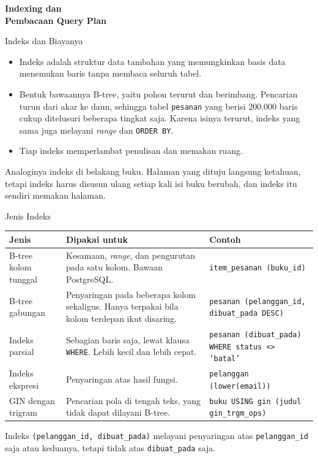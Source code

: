 \documentclass[aspectratio=169, table, 12pt]{beamer}
\begin{document}
\begin{frame}{\hfill}
  \centering
  \Huge{\textbf{Indexing dan\\Pembacaan Query Plan}}
\end{frame}

\begin{frame}{{\Large Indeks dan Biayanya}}
  \vspace{10pt}
  \begin{itemize}
    \item Indeks adalah struktur data tambahan yang memungkinkan basis data
          menemukan baris tanpa membaca seluruh tabel.
    \item Bentuk bawaannya B-tree, yaitu pohon terurut dan berimbang.
          Pencarian turun dari akar ke daun, sehingga tabel \texttt{pesanan}
          yang berisi 200.000 baris cukup ditelusuri beberapa tingkat saja.
          Karena isinya terurut, indeks yang sama juga melayani \textit{range}
          dan \texttt{ORDER BY}.
    \item Tiap indeks memperlambat penulisan dan memakan ruang.
  \end{itemize}
  \vspace{10pt}
  {\footnotesize Analoginya indeks di belakang buku. Halaman yang dituju
  langsung ketahuan, tetapi indeks harus disusun ulang setiap kali isi buku
  berubah, dan indeks itu sendiri memakan halaman.}
\end{frame}

\begin{frame}{{\Large Jenis Indeks}}
  \vspace{5pt}
  {\centering
  {\scriptsize
  \begin{tabularx}{\textwidth}{lYY}
    \hline
    \textbf{Jenis} & \textbf{Dipakai untuk} & \textbf{Contoh} \\
    \hline
    B-tree kolom tunggal & Kesamaan, \textit{range}, dan pengurutan pada satu kolom. Bawaan PostgreSQL. & \texttt{item\_pesanan (buku\_id)} \\
    \hline
    B-tree gabungan & Penyaringan pada beberapa kolom sekaligus. Hanya terpakai bila kolom terdepan ikut disaring. & \texttt{pesanan (pelanggan\_id, dibuat\_pada DESC)} \\
    \hline
    Indeks parsial & Sebagian baris saja, lewat klausa \texttt{WHERE}. Lebih kecil dan lebih cepat. & \texttt{pesanan (dibuat\_pada) WHERE status <> 'batal'} \\
    \hline
    Indeks ekspresi & Penyaringan atas hasil fungsi. & \texttt{pelanggan (lower(email))} \\
    \hline
    GIN dengan trigram & Pencarian pola di tengah teks, yang tidak dapat dilayani B-tree. & \texttt{buku USING gin (judul gin\_trgm\_ops)} \\
    \hline
  \end{tabularx}}\par}

  \vspace{6pt}
  {\footnotesize Indeks \texttt{(pelanggan\_id, dibuat\_pada)} melayani
  penyaringan atas \texttt{pelanggan\_id} saja atau keduanya, tetapi tidak atas
  \texttt{dibuat\_pada} saja.}
\end{frame}
\end{document}
